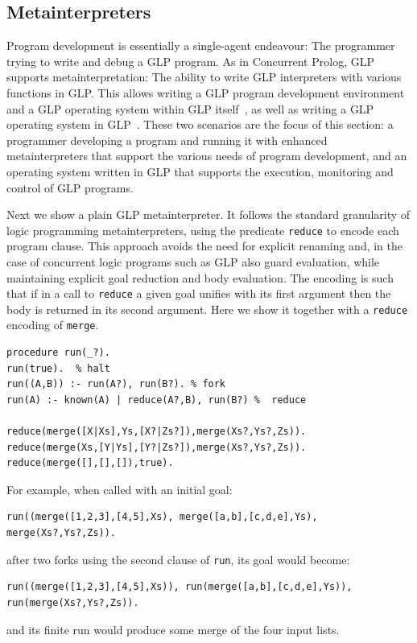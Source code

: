 \subsection{Metainterpreters}

Program development is essentially a single-agent endeavour:  The programmer trying to write and debug a GLP program.  As in Concurrent Prolog, GLP supports metainterpretation:  The ability to write GLP interpreters with various functions in GLP.  This allows writing a GLP program development environment and a GLP operating system within GLP itself~\cite{sterling1994art,safra1988meta,shapiro1982algorithmic,lichtenstein1988concurrent,silverman1988logix}, as well as writing a GLP operating system in GLP~\cite{shapiro1984systems}. These two scenarios are the focus of this section:
a programmer developing a program and running it with enhanced metainterpreters that support the various needs of program development, and an operating system written in GLP that supports the execution, monitoring and control of GLP programs.

Next we show a plain GLP metainterpreter.
It follows the standard granularity of logic programming metainterpreters, using the predicate \verb|reduce| to encode each program clause. This approach avoids the need for explicit renaming and, in the case of concurrent logic programs such as GLP also guard evaluation, while maintaining explicit goal reduction and body evaluation. The encoding is such that if in a call to \verb|reduce| a given goal unifies with its first argument then the body is returned in its second argument. Here we show it together with a \verb|reduce| encoding of \verb|merge|.

\label{program:meta}
\begin{small}
\begin{verbatim}
procedure run(_?).
run(true).  % halt
run((A,B)) :- run(A?), run(B?). % fork
run(A) :- known(A) | reduce(A?,B), run(B?) %  reduce

reduce(merge([X|Xs],Ys,[X?|Zs?]),merge(Xs?,Ys?,Zs)). 
reduce(merge(Xs,[Y|Ys],[Y?|Zs?]),merge(Xs?,Ys?,Zs)).
reduce(merge([],[],[]),true). 
\end{verbatim}
\end{small}
 
 
For example, when called with an initial goal:
\begin{small}
\begin{verbatim}
run((merge([1,2,3],[4,5],Xs), merge([a,b],[c,d,e],Ys), merge(Xs?,Ys?,Zs)).
\end{verbatim}
\end{small}
after two forks using the second clause of \verb|run|, its goal would become:
\begin{small}
\begin{verbatim}
run((merge([1,2,3],[4,5],Xs)), run(merge([a,b],[c,d,e],Ys)), run(merge(Xs?,Ys?,Zs)).
\end{verbatim}
\end{small}
and its finite run would produce some merge of the four input lists.


